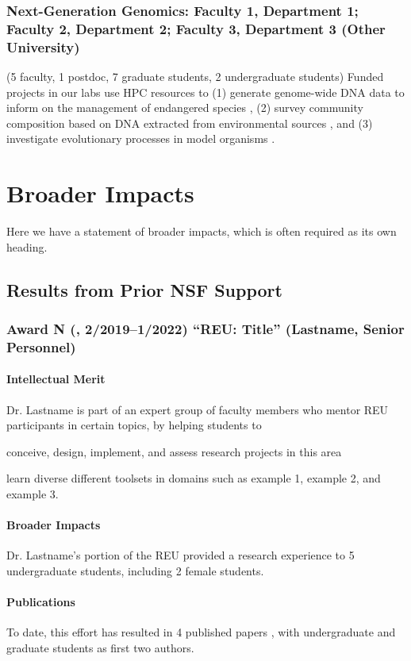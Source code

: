\subsubsection{Next-Generation Genomics: Faculty 1, Department 1; Faculty 2, Department 2; Faculty 3, Department 3 (Other University)}

(5 faculty, 1 postdoc, 7 graduate students, 2 undergraduate students)
Funded projects in our labs use HPC resources to (1) generate genome-wide DNA data to inform on the management of endangered species \cite{torkamaneh2016}, (2) survey community composition based on DNA extracted from environmental sources \cite{watts2019}, and (3) investigate evolutionary processes in model organisms \cite{hurt2021}.

\section*{Broader Impacts}

Here we have a statement of broader impacts, which is often required as its own heading.

\subsection{Results from Prior NSF Support}

\subsubsection{Award N (, 2/2019--1/2022) ``REU: Title'' (Lastname, Senior Personnel)}

\paragraph{Intellectual Merit}

Dr. Lastname is part of an expert group of faculty members who mentor REU participants in certain topics, by helping students to
\begin{enumerate*}[label=(\arabic*), itemjoin={{; }}, itemjoin*={{; and }}]
\item conceive, design, implement, and assess research projects in this area
\item learn diverse different toolsets in domains such as example 1, example 2, and example 3.
\end{enumerate*}

\paragraph{Broader Impacts}
Dr. Lastname's portion of the REU provided a research experience to 5 undergraduate students, including 2 female students.

\paragraph{Publications}
To date, this effort has resulted in 4 published papers \cite{paudel2019a,paudel2019b,paudel2018,mookiah2017}, with undergraduate and graduate students as first two authors.

\renewcommand{\bibname}{References Cited}
\printbibliography[heading=bibnumbered]


